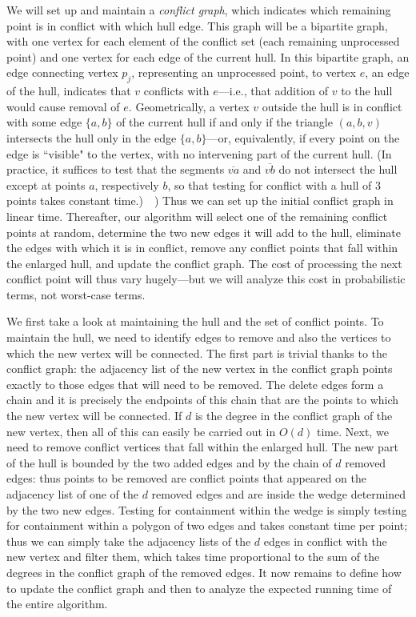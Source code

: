 \documentclass[11pt]{article}
\begin{document}
We will set up and maintain a \emph{conflict graph}, which indicates which
remaining point is in conflict with which hull edge.  This graph will be a
bipartite graph, with one vertex for each element of the conflict set (each
remaining unprocessed point) and one vertex for each edge of the current hull.
In this bipartite graph, an edge connecting vertex $p_j$, representing an
unprocessed point, to vertex $e$, an edge of the hull, indicates that $v$
conflicts with $e$---i.e., that addition of $v$ to the hull would cause removal
of $e$.  Geometrically, a vertex $v$ outside the hull is in conflict with some
edge $\{a,b\}$ of the current hull if and only if the triangle $(a,b,v)$
intersects the hull only in the edge $\{a,b\}$---or, equivalently, if every
point on the edge is ``visible" to the vertex, with no intervening part of the
current hull.  (In practice, it suffices to test that the segments
$\overline{va}$ and $\overline{vb}$ do not intersect the hull except at points
$a$, respectively $b$, so that testing for conflict with a hull of 3 points
takes constant time.)\ \ ) Thus we can set up the initial conflict graph in
linear time.  Thereafter, our algorithm will select one of the remaining
conflict points at random, determine the two new edges it will add to the hull,
eliminate the edges with which it is in conflict, remove any conflict points
that fall within the enlarged hull, and update the conflict graph.  The cost
of processing the next conflict point will thus vary hugely---but we will
analyze this cost in probabilistic terms, not worst-case terms.

We first take a look at maintaining the hull and the set of conflict points.
To maintain the hull, we need to identify edges to remove and also the vertices
to which the new vertex will be connected.  The first part is trivial thanks
to the conflict graph: the adjacency list of the new vertex in the conflict
graph points exactly to those edges that will need to be removed.
The delete edges form a chain and it is precisely the endpoints of this
chain that are the points to which the new vertex will be connected.
If $d$ is the degree in the conflict graph of the new vertex, then all of this
can easily be carried out in $O(d)$ time.  Next, we need to remove conflict
vertices that fall within the enlarged hull.  The new part of the hull is
bounded by the two added edges and by the chain of $d$ removed edges: thus
points to be removed are conflict points that appeared on the adjacency list
of one of the $d$ removed edges and are inside the wedge determined by the
two new edges.  Testing for containment within the wedge is simply testing for
containment within a polygon of two edges and takes constant time per
point; thus we can simply take the adjacency lists of the $d$ edges in conflict
with the new vertex and filter them, which takes time proportional to the
sum of the degrees in the conflict graph of the removed edges.
It now remains to define how to update the conflict graph and then to analyze
the expected running time of the entire algorithm.
\end{document}
